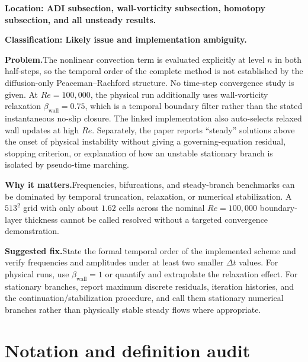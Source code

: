 \documentclass[11pt]{article}
\newcommand{\classification}[1]{\par\noindent\textbf{Classification: #1.}\par}
\newcommand{\location}[1]{\textbf{Location: #1}}
\newcommand{\problem}{\noindent\textbf{Problem.}\hspace{0.35em}}
\newcommand{\importance}{\par\noindent\textbf{Why it matters.}\hspace{0.35em}}
\newcommand{\fix}{\par\noindent\textbf{Suggested fix.}\hspace{0.35em}}
\begin{document}
\location{ADI subsection, wall-vorticity subsection, homotopy subsection, and all unsteady results.}

\classification{Likely issue and implementation ambiguity}

\problem The nonlinear convection term is evaluated explicitly at level $n$ in both half-steps, so the temporal order of the complete method is not established by the diffusion-only Peaceman--Rachford structure.  No time-step convergence study is given.  At $Re=100{,}000$, the physical run additionally uses wall-vorticity relaxation $\beta_{\mathrm{wall}}=0.75$, which is a temporal boundary filter rather than the stated instantaneous no-slip closure.  The linked implementation also auto-selects relaxed wall updates at high $Re$.  Separately, the paper reports ``steady'' solutions above the onset of physical instability without giving a governing-equation residual, stopping criterion, or explanation of how an unstable stationary branch is isolated by pseudo-time marching.

\importance Frequencies, bifurcations, and steady-branch benchmarks can be dominated by temporal truncation, relaxation, or numerical stabilization.  A $513^2$ grid with only about $1.62$ cells across the nominal $Re=100{,}000$ boundary-layer thickness cannot be called resolved without a targeted convergence demonstration.

\fix State the formal temporal order of the implemented scheme and verify frequencies and amplitudes under at least two smaller $\Delta t$ values.  For physical runs, use $\beta_{\mathrm{wall}}=1$ or quantify and extrapolate the relaxation effect.  For stationary branches, report maximum discrete residuals, iteration histories, and the continuation/stabilization procedure, and call them stationary numerical branches rather than physically stable steady flows where appropriate.

\section*{Notation and definition audit}
\end{document}
